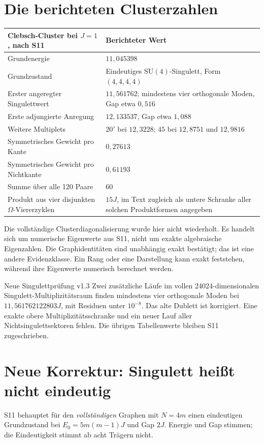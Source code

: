 \section{Die berichteten Clusterzahlen}
\par\noindent\begin{tabularx}{\linewidth}{L{74mm}Y}
\toprule
\textbf{Clebsch-Cluster bei $J=1$, nach S11}&\textbf{Berichteter Wert}\\\midrule
Grundenergie&$11{,}045398$\\
Grundzustand&Eindeutiges $\mathrm{SU}(4)$-Singulett, Form $(4,4,4,4)$\\
Erster angeregter Singulettwert&$11{,}561762$; mindestens vier orthogonale Moden, Gap etwa $0{,}516$\\
Erste adjungierte Anregung&$12{,}133537$, Gap etwa $1{,}088$\\
Weitere Multiplets&$20'$ bei $12{,}3228$; $45$ bei $12{,}8751$ und $12{,}9816$\\
Symmetrisches Gewicht pro Kante&$0{,}27613$\\
Symmetrisches Gewicht pro Nichtkante&$0{,}61193$\\
Summe über alle 120 Paare&$60$\\
Produkt aus vier disjunkten $\Omega$-Viererzyklen&$15J$, im Text zugleich als untere Schranke aller solchen Produktformen angegeben\\\bottomrule
\end{tabularx}\par
Die vollständige Clusterdiagonalisierung wurde hier nicht wiederholt. Es handelt sich um numerische Eigenwerte aus S11, nicht um exakte algebraische Eigenzahlen. Die Graphidentitäten sind unabhängig exakt bestätigt; das ist eine andere Evidenzklasse. Ein Rang oder eine Darstellung kann exakt feststehen, während ihre Eigenwerte numerisch berechnet werden.

\begin{grenze}{Neue Singulettprüfung v1.3}
Zwei zusätzliche Läufe im vollen 24024-dimensionalen Singulett-Multiplizitätsraum finden mindestens vier orthogonale Moden bei $11{,}561762122803J$, mit Residuen unter $10^{-8}$. Das alte Dublett ist korrigiert. Eine exakte obere Multiplizitätsschranke und ein neuer Lauf aller Nichtsingulettsektoren fehlen. Die übrigen Tabellenwerte bleiben S11 zugeschrieben.
\end{grenze}
\section{Neue Korrektur: Singulett heißt nicht eindeutig}
S11 behauptet für den \emph{vollständigen} Graphen mit $N=4m$ einen eindeutigen Grundzustand bei $E_0=5m(m-1)J$ und Gap $2J$. Energie und Gap stimmen; die Eindeutigkeit stimmt ab acht Trägern nicht.

